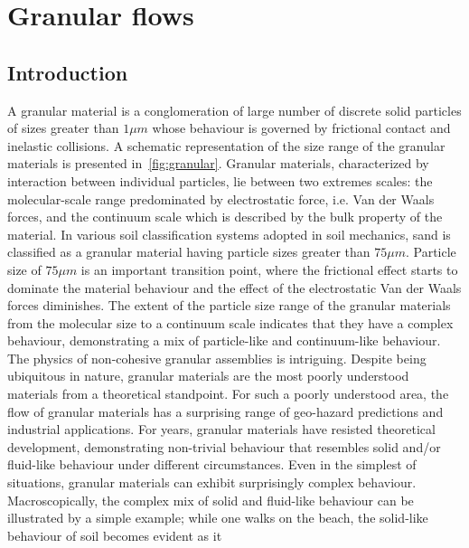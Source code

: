 \chapter{Granular flows}

\ifpdf
    \graphicspath{{Chapter2/figs/raster/}{Chapter2/figs/pdf/}{Chapter2/figs/}}
\else
    \graphicspath{{Chapter2/figs/vector/}{Chapter2/figs/}}
\fi

\section{Introduction}

A granular material is a conglomeration of large number of discrete solid 
particles of sizes greater than $1\mu m$ whose behaviour is governed by 
frictional contact and inelastic collisions. A schematic representation of the 
size range of the granular materials is presented in~\cref{fig:granular}. 
Granular materials, characterized by interaction between individual particles, 
lie between two extremes scales: the molecular-scale range predominated by 
electrostatic force, i.e. Van der Waals forces, and the continuum scale which 
is described by the bulk property of the material. In various soil 
classification systems adopted in soil mechanics, sand is classified as a 
granular material having particle sizes greater than $75\mu m$. Particle size 
of $75\mu m$ is an important transition point, where the frictional effect 
starts to dominate the material behaviour and the effect of the electrostatic 
Van der Waals forces diminishes. The extent of the particle size range of the 
granular materials from the molecular size to a continuum scale indicates that 
they have a complex behaviour, demonstrating a mix of particle-like and 
continuum-like behaviour. The physics of non-cohesive granular assemblies is 
intriguing. Despite being ubiquitous in nature, granular materials are the most 
poorly understood materials from a theoretical standpoint. For such a poorly 
understood area, the flow of granular materials has a surprising range of 
geo-hazard predictions and industrial applications. For years, granular 
materials have resisted theoretical development, demonstrating non-trivial 
behaviour that resembles solid and/or fluid-like behaviour under different 
circumstances. Even in the simplest of situations, granular materials can 
exhibit surprisingly complex behaviour. Macroscopically, the complex mix of 
solid and fluid-like behaviour can be illustrated by a simple example; while 
one walks on the beach, the solid-like behaviour of soil becomes evident as it 

